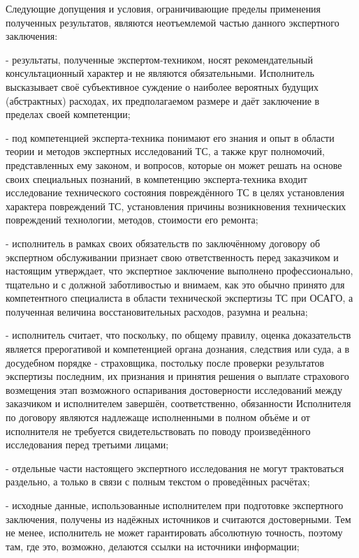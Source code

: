 Следующие допущения и условия, ограничивающие пределы применения полученных результатов, являются неотъемлемой частью данного экспертного заключения:
      
\noindent  - результаты, полученные экспертом-техником, носят рекомендательный консультационный характер и не являются обязательными. Исполнитель высказывает своё субъективное суждение о наиболее вероятных будущих (абстрактных) расходах, их предполагаемом размере и даёт заключение в пределах своей компетенции;

\noindent - под компетенцией эксперта-техника понимают его знания и опыт в области теории и методов экспертных исследований ТС, а также круг полномочий, представленных ему законом, и вопросов, которые он может решать на основе своих специальных познаний, в компетенцию эксперта-техника входит исследование технического состояния повреждённого ТС в целях установления характера повреждений ТС, установления причины возникновения технических повреждений технологии, методов, стоимости его ремонта;

\noindent - исполнитель в рамках своих обязательств по заключённому договору об экспертном обслуживании признает свою ответственность перед заказчиком и настоящим утверждает, что экспертное заключение выполнено профессионально, тщательно и с должной заботливостью и внимаем, как это обычно принято для компетентного специалиста в области технической экспертизы ТС при ОСАГО, а полученная величина восстановительных расходов, разумна и реальна;

\noindent - исполнитель считает, что поскольку, по общему правилу, оценка доказательств является прерогативой и компетенцией органа дознания, следствия или суда, а в досудебном порядке - страховщика, постольку после проверки результатов экспертизы последним, их признания и принятия решения о выплате страхового возмещения этап возможного оспаривания достоверности исследований между заказчиком и исполнителем завершён,  соответственно, обязанности Исполнителя по договору являются надлежаще исполненными в полном объёме и от исполнителя не требуется свидетельствовать по поводу произведённого исследования перед третьими лицами;

\noindent - отдельные части настоящего экспертного исследования не могут трактоваться раздельно, а только в связи с полным текстом о проведённых расчётах;

\noindent - исходные данные, использованные исполнителем при подготовке экспертного заключения, получены из надёжных источников и считаются достоверными. Тем не менее, исполнитель не может гарантировать абсолютную точность, поэтому там, где это, возможно, делаются ссылки на источники информации;

